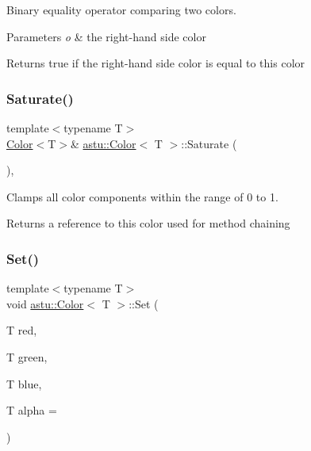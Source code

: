 Binary equality operator comparing two colors.


\begin{DoxyParams}{Parameters}
{\em o} & the right-\/hand side color \\
\hline
\end{DoxyParams}
\begin{DoxyReturn}{Returns}
{\ttfamily true} if the right-\/hand side color is equal to this color 
\end{DoxyReturn}
\mbox{\label{classastu_1_1Color_a60780325071ef6c95b113f9f5f9905b4}} 
\subsubsection{\texorpdfstring{Saturate()}{Saturate()}}
{\footnotesize\ttfamily template$<$typename T$>$ \\
\hyperlink{classastu_1_1Color}{Color}$<$T$>$\& \hyperlink{classastu_1_1Color}{astu\+::\+Color}$<$ T $>$\+::Saturate (\begin{DoxyParamCaption}{ }\end{DoxyParamCaption})\hspace{0.3cm}{\ttfamily [inline]}, {\ttfamily [noexcept]}}

Clamps all color components within the range of 0 to 1.

\begin{DoxyReturn}{Returns}
a reference to this color used for method chaining 
\end{DoxyReturn}
\mbox{\label{classastu_1_1Color_ad5aaf54919fed257c37b6b5747bd01c8}} 
\subsubsection{\texorpdfstring{Set()}{Set()}}
{\footnotesize\ttfamily template$<$typename T$>$ \\
void \hyperlink{classastu_1_1Color}{astu\+::\+Color}$<$ T $>$\+::Set (\begin{DoxyParamCaption}\item[{T}]{red,  }\item[{T}]{green,  }\item[{T}]{blue,  }\item[{T}]{alpha = {} }\end{DoxyParamCaption})\hspace{0.3cm}{\ttfamily [inline]}}

